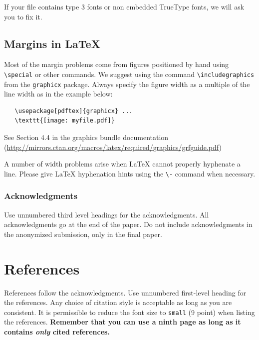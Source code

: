 \documentclass{article}
\begin{document}
If your file contains type 3 fonts or non embedded TrueType fonts, we
will ask you to fix it.

\subsection{Margins in \LaTeX{}}

Most of the margin problems come from figures positioned by hand using
\verb+\special+ or other commands. We suggest using the command
\verb+\includegraphics+ from the \verb+graphicx+ package. Always
specify the figure width as a multiple of the line width as in the
example below:
\begin{verbatim}
   \usepackage[pdftex]{graphicx} ...
   \texttt{[image: myfile.pdf]}
\end{verbatim}
See Section 4.4 in the graphics bundle documentation
(\url{http://mirrors.ctan.org/macros/latex/required/graphics/grfguide.pdf})

A number of width problems arise when \LaTeX{} cannot properly
hyphenate a line. Please give LaTeX hyphenation hints using the
\verb+\-+ command when necessary.

\subsubsection*{Acknowledgments}

Use unnumbered third level headings for the acknowledgments. All
acknowledgments go at the end of the paper. Do not include
acknowledgments in the anonymized submission, only in the final paper.

\section*{References}

References follow the acknowledgments. Use unnumbered first-level
heading for the references. Any choice of citation style is acceptable
as long as you are consistent. It is permissible to reduce the font
size to \verb+small+ (9 point) when listing the references. {\bf
  Remember that you can use a ninth page as long as it contains
  \emph{only} cited references.}
\medskip

\small
\end{document}
